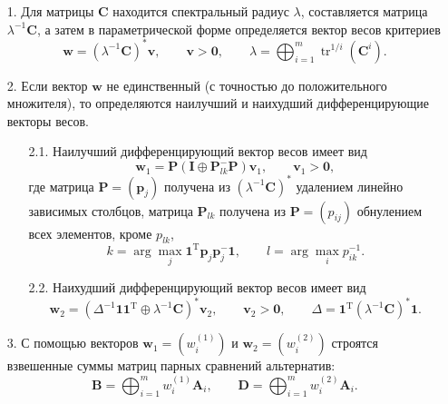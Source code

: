 \documentclass[specialist, substylefile = spbureport.rtx,
               subf,href,colorlinks=true, 12pt]{disser}
\begin{document}
    \begin{itemize}
        \item[1.]
        Для матрицы $\bm{C}$ находится спектральный радиус $\lambda$, составляется матрица $\lambda^{-1}\bm{C}$, а затем в параметрической форме определяется вектор весов критериев
        $$
        \bm{w}
        =
        (\lambda^{-1}\bm{C})^{\ast}\bm{v},
        \qquad
        \bm{v}>\bm{0},
        \qquad
        \lambda
        =
        \bigoplus_{i=1}^{m}{\mathop\mathrm{tr}}^{1/i}(\bm{C}^{i}).
        $$
        \item[2.]
        Если вектор $\bm{w}$ не единственный (с точностью до положительного множителя), то определяются наилучший и наихудший дифференцирующие векторы весов.
        \begin{itemize}
            \item[2.1.]
            Наилучший дифференцирующий вектор весов имеет вид
            $$
            \bm{w}_{1}
            =
            \bm{P}(\bm{I}\oplus\bm{P}_{lk}^{-}\bm{P})\bm{v}_{1},
            \qquad
            \bm{v}_{1}
            >
            \bm{0},
            $$
            где матрица $\bm{P}=(\bm{p}_{j})$ получена из $(\lambda^{-1}\bm{C})^{\ast}$ удалением линейно зависимых столбцов, матрица $\bm{P}_{lk}$ получена из $\bm{P}=(p_{ij})$ обнулением всех элементов, кроме $p_{lk}$,
            $$
            k
            =
            \arg\max_{j}\bm{1}^{\mathrm{T}}\bm{p}_{j}\bm{p}_{j}^{-}\bm{1},
            \qquad
            l
            =
            \arg\max_{i}p_{ik}^{-1}.
            $$
            \item[2.2.]
            Наихудший дифференцирующий вектор весов имеет вид
            $$
            \bm{w}_{2}
            =
            (\Delta^{-1}\bm{1}\bm{1}^{\mathrm{T}}\oplus\lambda^{-1}\bm{C})^{\ast}\bm{v}_{2},
            \qquad
            \bm{v}_{2}
            >
            \bm{0},
            \qquad
            \Delta
            =
            \bm{1}^{\mathrm{T}}(\lambda^{-1}\bm{C})^{\ast}\bm{1}.
            $$
        \end{itemize}
        \item[3.]
        С помощью векторов $\bm{w}_{1}=(w_{i}^{(1)})$ и $\bm{w}_{2}=(w_{i}^{(2)})$ строятся взвешенные суммы матриц парных сравнений альтернатив:
        $$
        \bm{B}
        =
        \bigoplus_{i=1}^{m}w^{(1)}_{i}\bm{A}_{i},
        \qquad
        \bm{D}
        =
        \bigoplus_{i=1}^{m}w^{(2)}_{i}\bm{A}_{i}.
        $$
        

\end{itemize}
\end{document}
